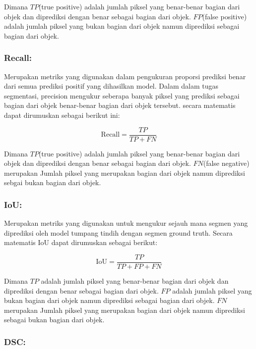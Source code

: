 \noindent Dimana \(TP\)(true positive) adalah jumlah piksel yang benar-benar bagian dari objek dan diprediksi dengan benar sebagai bagian dari objek. \(FP\)(false positive) adalah jumlah piksel yang bukan bagian dari objek namun diprediksi sebagai bagian dari objek.

\subsubsection{Recall:}
\noindent Merupakan metriks yang digunakan dalam pengukuran proporsi prediksi benar dari semua prediksi positif yang dihasilkan model.  Dalam dalam tugas segmentasi, precision mengukur seberapa banyak piksel yang prediksi sebagai bagian dari objek benar-benar bagian dari objek tersebut. secara matematis dapat dirumuskan sebagai berikut ini:

\begin{equation}
	\text{Recall} = \frac{TP}{TP + FN}
\end{equation}

\noindent Dimana \(TP\)(true positive) adalah jumlah piksel yang benar-benar bagian dari objek dan diprediksi dengan benar sebagai bagian dari objek. \(FN\)(false negative) merupakan Jumlah piksel yang merupakan bagian dari objek namun diprediksi sebgai bukan bagian dari objek.

\subsubsection{IoU:}
\noindent Merupakan metriks yang digunakan untuk mengukur sejauh mana segmen yang diprediksi oleh model tumpang tindih dengan segmen ground truth. Secara matematis IoU dapat dirumuskan sebagai berikut:

\begin{equation}
	\text{IoU} = \frac{TP}{TP + FP + FN}
\end{equation}

\noindent Dimana \(TP\) adalah jumlah piksel yang benar-benar bagian dari objek dan diprediksi dengan benar sebagai bagian dari objek. \(FP\) adalah jumlah piksel yang bukan bagian dari objek namun diprediksi sebagai bagian dari objek. \(FN\) merupakan Jumlah piksel yang merupakan bagian dari objek namun diprediksi sebagai bukan bagian dari objek. 

\subsubsection{DSC:}

